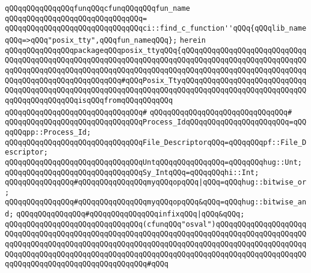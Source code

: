 \verb|qQQqqQQqqQQqqQQqfunqQQqcfunqQQqqQQqfun_name|\newline
\verb|qQQqqQQqqQQqqQQqqQQqqQQqqQQqqQQq=|\newline
\verb|qQQqqQQqqQQqqQQqqQQqqQQqqQQqqQQqci::find_c_function''qQQq{qQQqlib_nameqQQq=>qQQq"posix_tty",qQQqfun_nameqQQq};|\newline
\verb|herein|\newline
\newline
\verb|qQQqqQQqqQQqqQQqpackageqQQqposix_ttyqQQq{qQQqqQQqqQQqqQQqqQQqqQQqqQQqqQQqqQQqqQQqqQQqqQQqqQQqqQQqqQQqqQQqqQQqqQQqqQQqqQQqqQQqqQQqqQQqqQQqqQQqqQQqqQQqqQQqqQQqqQQqqQQqqQQqqQQqqQQqqQQqqQQqqQQqqQQqqQQqqQQqqQQqqQQqqQQqqQQqqQQqqQQqqQQqqQQqqQQq#qQQqPosix_TtyqQQqqQQqqQQqqQQqqQQqqQQqqQQqqQQqqQQqqQQqqQQqqQQqqQQqqQQqqQQqqQQqqQQqqQQqqQQqqQQqqQQqqQQqqQQqqQQqqQQqqQQqqQQqqQQqqQQqisqQQqfromqQQqqQQqqQQq|\newline
\verb|qQQqqQQqqQQqqQQqqQQqqQQqqQQqqQQq#|\newline
\verb|qQQqqQQqqQQqqQQqqQQqqQQqqQQqqQQq#|\newline
\verb|qQQqqQQqqQQqqQQqqQQqqQQqqQQqqQQqProcess_IdqQQqqQQqqQQqqQQqqQQqqQQq=qQQqqQQqpp::Process_Id;|\newline
\newline
\verb|qQQqqQQqqQQqqQQqqQQqqQQqqQQqqQQqFile_DescriptorqQQq=qQQqqQQqpf::File_Descriptor;|\newline
\newline
\verb|qQQqqQQqqQQqqQQqqQQqqQQqqQQqqQQqUntqQQqqQQqqQQqqQQq=qQQqqQQqhug::Unt;|\newline
\verb|qQQqqQQqqQQqqQQqqQQqqQQqqQQqqQQqSy_IntqQQq=qQQqqQQqhi::Int;|\newline
\newline
\verb|qQQqqQQqqQQqqQQq#qQQqqQQqqQQqqQQqmyqQQqopqQQq|\verb#|qQQq=qQQqhug::bitwise_or;#\newline
\verb|qQQqqQQqqQQqqQQq#qQQqqQQqqQQqqQQqmyqQQqopqQQq&qQQq=qQQqhug::bitwise_and;|\newline
\newline
\verb|qQQqqQQqqQQqqQQq#qQQqqQQqqQQqqQQqinfixqQQq|\verb#|qQQq&qQQq;#\newline
\newline
\newline
\verb|qQQqqQQqqQQqqQQqqQQqqQQqqQQqqQQq(cfunqQQq"osval")qQQqqQQqqQQqqQQqqQQqqQQqqQQqqQQqqQQqqQQqqQQqqQQqqQQqqQQqqQQqqQQqqQQqqQQqqQQqqQQqqQQqqQQqqQQqqQQqqQQqqQQqqQQqqQQqqQQqqQQqqQQqqQQqqQQqqQQqqQQqqQQqqQQqqQQqqQQqqQQqqQQqqQQqqQQqqQQqqQQqqQQqqQQqqQQqqQQqqQQqqQQqqQQqqQQqqQQqqQQqqQQqqQQqqQQqqQQqqQQqqQQqqQQqqQQqqQQqqQQqqQQq#qQQq|\newline
